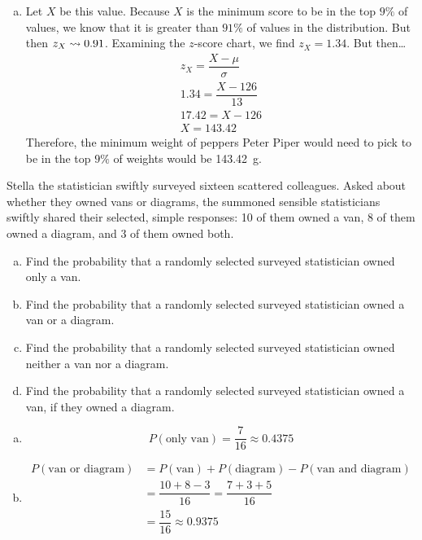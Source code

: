 \documentclass[12pt,letterpaper]{exam}
\begin{document}
\begin{questions}
\begin{enumerate}[(a)]
\item Let $X$ be this value. Because $X$ is the minimum score to be in the top $9\%$ of values, we know that it is greater than $91\%$ of values in the distribution. But then $z_X \rightsquigarrow 0.91$. Examining the $z$-score chart, we find $z_X= 1.34$. But then\dots
	\[
	\begin{gathered}
	z_X= \dfrac{X - \mu}{\sigma} \\
	1.34= \dfrac{X - 126}{13} \\
	17.42= X - 126 \\
	X= 143.42
	\end{gathered}
	\]
Therefore, the minimum weight of peppers Peter Piper would need to pick to be in the top $9\%$ of weights would be 143.42~g.  
\end{enumerate}



\newpage
\question[15] Stella the statistician swiftly surveyed sixteen scattered colleagues. Asked about whether they owned vans or diagrams, the summoned sensible statisticians swiftly shared their selected, simple responses: 10 of them owned a van, 8 of them owned a diagram, and 3 of them owned both. 
	\begin{enumerate}[(a)]
	\item Find the probability that a randomly selected surveyed statistician owned only a van. 
	\item Find the probability that a randomly selected surveyed statistician owned a van or a diagram. 
	\item Find the probability that a randomly selected surveyed statistician owned neither a van nor a diagram.
	\item Find the probability that a randomly selected surveyed statistician owned a van, if they owned a diagram. 
	\end{enumerate} \pspace

\sol 
\begin{enumerate}[(a)]
\item 
	\[
	P(\text{only van})= \dfrac{7}{16} \approx 0.4375
	\] \pspace

\item 
	\[
	\begin{aligned}
	P(\text{van or diagram})&= P(\text{van}) + P(\text{diagram}) - P(\text{van and diagram}) \\[0.1cm]
	&= \dfrac{10 + 8 - 3}{16}= \dfrac{7 + 3 + 5}{16} \\[0.1cm]
	&= \dfrac{15}{16} \approx 0.9375
	\end{aligned}
	\] \pspace


\end{enumerate}
\end{questions}
\end{document}

